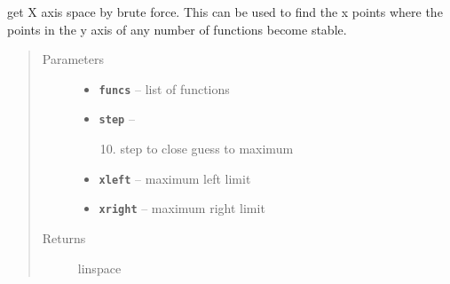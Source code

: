 \documentclass[letterpaper,10pt,english]{sphinxmanual}
\begin{document}
\begin{fulllineitems}
\label{RRtoolbox.lib.arrayops:RRtoolbox.lib.arrayops.basic.get_x_space}
get X axis space by brute force. This can be used to find the x points
where the points in the y axis of any number of functions become stable.
\begin{quote}\begin{description}
\item[{Parameters}] \leavevmode\begin{itemize}
\item {} 
\textbf{\texttt{funcs}} -- list of functions

\item {} 
\textbf{\texttt{step}} -- \begin{enumerate}
\setcounter{enumi}{9}
\item {} 
step to close guess to maximum

\end{enumerate}


\item {} 
\textbf{\texttt{xleft}} -- maximum left limit

\item {} 
\textbf{\texttt{xright}} -- maximum right limit

\end{itemize}

\item[{Returns}] \leavevmode
linspace

\end{description}\end{quote}

\end{fulllineitems}

\end{document}
